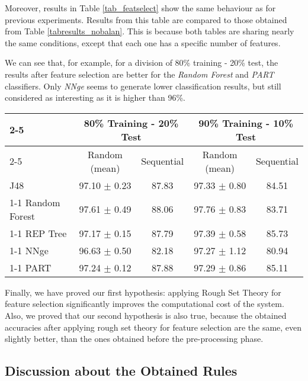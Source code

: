 \documentclass{llncs}
\begin{document}
Moreover, results in Table \ref{tab_featselect} show the same behaviour as for previous experiments. Results from this table are compared to those obtained from Table \ref{tabresults_nobalan}. This is because both tables are sharing nearly the same conditions, except that each one has a specific number of features.

We can see that, for example, for a division of 80\% training - 20\% test, the results after feature selection are better for the \textit{Random Forest} and \textit{PART} classifiers. Only \textit{NNge} seems to generate lower classification results, but still considered as interesting as it is higher than 96\%.

\begin{table*}[htpb]
\centering
 \caption{\label{tab_featselect} Percentage of correctly classified patterns for the unbalanced dataset with 9 features.}
{\small
\begin{tabular}{|l|c|c|c|c|}
\cline{2-5}
\multicolumn{1}{l|}{} & \multicolumn{2}{c|}{80\% Training - 20\% Test} & \multicolumn{2}{c|}{90\% Training - 10\% Test} \\
\cline{2-5}
\multicolumn{1}{l|}{} & Random (mean) & Sequential & Random (mean) & Sequential \\
\hline
J48 & 97.10 $\pm$ 0.23 & 87.83 & 97.33 $\pm$ 0.80 & 84.51 \\
\cline{1-1}
Random Forest & 97.61 $\pm$ 0.49 & 88.06 & 97.76 $\pm$ 0.83 & 83.71 \\
\cline{1-1}
REP Tree & 97.17 $\pm$ 0.15 & 87.79 & 97.39 $\pm$ 0.58 & 85.73 \\
\cline{1-1}
NNge & 96.63 $\pm$ 0.50 & 82.18 & 97.27 $\pm$ 1.12 & 80.94 \\
\cline{1-1}
PART & 97.24 $\pm$ 0.12 & 87.88 & 97.29 $\pm$ 0.86 & 85.11 \\
\hline
\end{tabular}
}
\end{table*}

Finally, we have proved our first hypothesis: applying Rough Set Theory for feature selection significantly improves the computational cost of the system. Also, we proved that our second hypothesis is also true, because the obtained accuracies after applying rough set theory for feature selection are the same, even slightly better, than the ones obtained before the pre-processing phase.

\subsection{Discussion about the Obtained Rules}
\label{subsec:rulesdiscussion}
\end{document}
